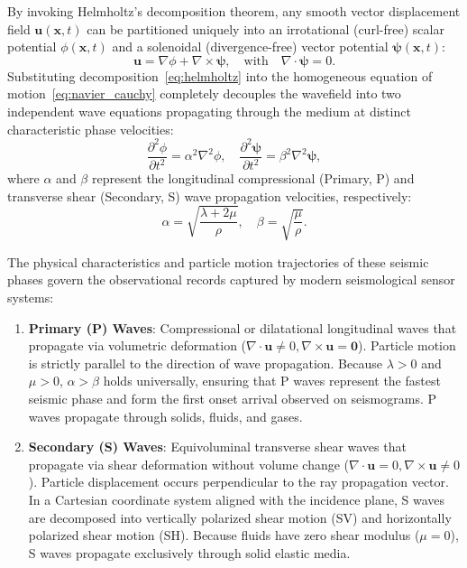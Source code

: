 By invoking Helmholtz's decomposition theorem, any smooth vector displacement field $\mathbf{u}(\mathbf{x}, t)$ can be partitioned uniquely into an irrotational (curl-free) scalar potential $\phi(\mathbf{x}, t)$ and a solenoidal (divergence-free) vector potential $\boldsymbol{\psi}(\mathbf{x}, t)$:
\begin{equation}
  \mathbf{u} = \nabla \phi + \nabla \times \boldsymbol{\psi}, \quad \text{with} \quad \nabla \cdot \boldsymbol{\psi} = 0.
  \label{eq:helmholtz}
\end{equation}
Substituting decomposition~\eqref{eq:helmholtz} into the homogeneous equation of motion~\eqref{eq:navier_cauchy} completely decouples the wavefield into two independent wave equations propagating through the medium at distinct characteristic phase velocities:
\begin{equation}
  \frac{\partial^2 \phi}{\partial t^2} = \alpha^2 \nabla^2 \phi, \quad \frac{\partial^2 \boldsymbol{\psi}}{\partial t^2} = \beta^2 \nabla^2 \boldsymbol{\psi},
  \label{eq:decoupled_wave_equations}
\end{equation}
where $\alpha$ and $\beta$ represent the longitudinal compressional (Primary, P) and transverse shear (Secondary, S) wave propagation velocities, respectively:
\begin{equation}
  \alpha = \sqrt{\frac{\lambda + 2\mu}{\rho}}, \quad \beta = \sqrt{\frac{\mu}{\rho}}.
  \label{eq:wave_velocities}
\end{equation}

The physical characteristics and particle motion trajectories of these seismic phases govern the observational records captured by modern seismological sensor systems:
\begin{enumerate}[label=(\alph*)]
  \item \textbf{Primary (P) Waves}: Compressional or dilatational longitudinal waves that propagate via volumetric deformation ($\nabla \cdot \mathbf{u} \neq 0, \nabla \times \mathbf{u} = \mathbf{0}$). Particle motion is strictly parallel to the direction of wave propagation. Because $\lambda > 0$ and $\mu > 0$, $\alpha > \beta$ holds universally, ensuring that P waves represent the fastest seismic phase and form the first onset arrival observed on seismograms. P waves propagate through solids, fluids, and gases.
  \item \textbf{Secondary (S) Waves}: Equivoluminal transverse shear waves that propagate via shear deformation without volume change ($\nabla \cdot \mathbf{u} = 0, \nabla \times \mathbf{u} \neq 0$). Particle displacement occurs perpendicular to the ray propagation vector. In a Cartesian coordinate system aligned with the incidence plane, S waves are decomposed into vertically polarized shear motion (SV) and horizontally polarized shear motion (SH). Because fluids have zero shear modulus ($\mu = 0$), S waves propagate exclusively through solid elastic media.
\end{enumerate}

